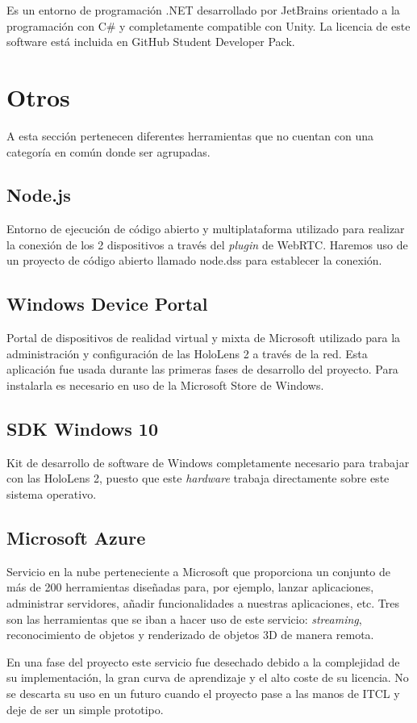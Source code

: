 Es un entorno de programación .NET desarrollado por JetBrains orientado a la programación con C\# y completamente compatible con Unity. La licencia de este software está incluida en GitHub Student Developer Pack.

\section{Otros}

A esta sección pertenecen diferentes herramientas que no cuentan con una categoría en común donde ser agrupadas.

\subsection{Node.js}

Entorno de ejecución de código abierto y multiplataforma utilizado para realizar la conexión de los 2 dispositivos a través del \textit{plugin} de WebRTC. Haremos uso de un proyecto de código abierto llamado node.dss \cite{node:dss} para establecer la conexión.

\subsection{Windows Device Portal}

Portal de dispositivos de realidad virtual y mixta de Microsoft \cite{windows:deviceportal} utilizado para la administración y configuración de las HoloLens 2 a través de la red. Esta aplicación fue usada durante las primeras fases de desarrollo del proyecto. Para instalarla es necesario en uso de la Microsoft Store de Windows.

\subsection{SDK Windows 10}

Kit de desarrollo de software de Windows \cite{windows:sdk} completamente necesario para trabajar con las HoloLens 2, puesto que este \textit{hardware} trabaja directamente sobre este sistema operativo.

\subsection{Microsoft Azure}

Servicio en la nube perteneciente a Microsoft \cite{microsoft:azure} que proporciona un conjunto de más de 200 herramientas diseñadas para, por ejemplo, lanzar aplicaciones, administrar servidores, añadir funcionalidades a nuestras aplicaciones, etc. Tres son las herramientas que se iban a hacer uso de este servicio: \textit{streaming}, reconocimiento de objetos y renderizado de objetos 3D de manera remota. 

En una fase del proyecto este servicio fue desechado debido a la complejidad de su implementación, la gran curva de aprendizaje y el alto coste de su licencia. No se descarta su uso en un futuro cuando el proyecto pase a las manos de ITCL y deje de ser un simple prototipo.